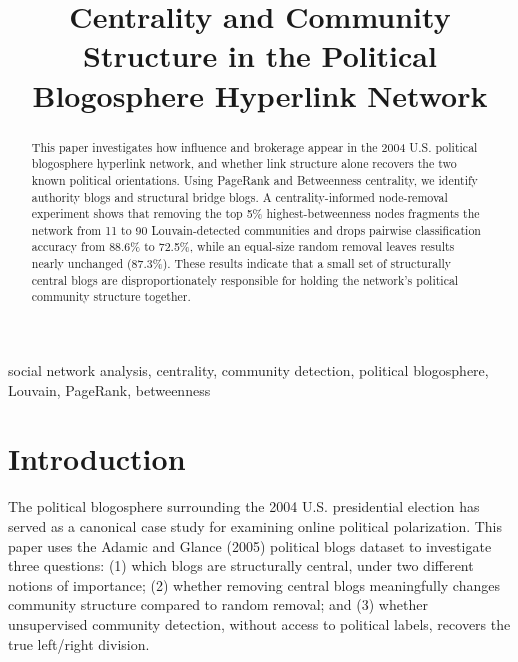 \documentclass[conference]{IEEEtran}
\begin{document}
\title{Centrality and Community Structure in the Political Blogosphere Hyperlink Network}

\author{
}

\maketitle

\begin{abstract}
This paper investigates how influence and brokerage appear in the 2004 U.S. political blogosphere hyperlink network, and whether link structure alone recovers the two known political orientations. Using PageRank and Betweenness centrality, we identify authority blogs and structural bridge blogs. A centrality-informed node-removal experiment shows that removing the top 5\% highest-betweenness nodes fragments the network from 11 to 90 Louvain-detected communities and drops pairwise classification accuracy from 88.6\% to 72.5\%, while an equal-size random removal leaves results nearly unchanged (87.3\%). These results indicate that a small set of structurally central blogs are disproportionately responsible for holding the network's political community structure together.
\end{abstract}

\begin{IEEEkeywords}
social network analysis, centrality, community detection, political blogosphere, Louvain, PageRank, betweenness
\end{IEEEkeywords}

\section{Introduction}
The political blogosphere surrounding the 2004 U.S. presidential election has served as a canonical case study for examining online political polarization. This paper uses the Adamic and Glance (2005) political blogs dataset \cite{adamic2005} to investigate three questions: (1) which blogs are structurally central, under two different notions of importance; (2) whether removing central blogs meaningfully changes community structure compared to random removal; and (3) whether unsupervised community detection, without access to political labels, recovers the true left/right division.
\end{document}
